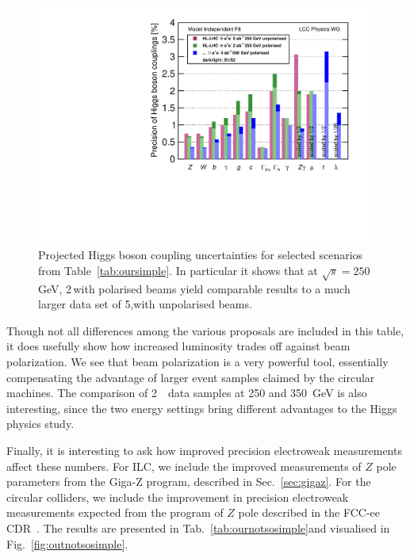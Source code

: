 \begin{figure}
\begin{center}
\includegraphics[width=0.7\hsize]{chapters/figures/DeltaHXX_SM_ILC_LEP_MI.pdf}
\caption{Projected Higgs boson coupling uncertainties for selected scenarios from Table~\ref{tab:oursimple}.
In particular it shows that at $\sqrt{s}=250$\,GeV, 2\,\iab  with polarised beams yield comparable results to a much larger data set of 5,\iab with unpolarised beams.}
\label{fig:oursimple}
\end{center}
\end{figure}


Though not all differences among the various proposals are included in
this table, it does usefully show how increased luminosity trades off
against beam polarization.   We see that beam polarization is a very
powerful tool, essentially compensating the advantage of larger event
samples claimed by the circular machines.   The comparison of 2~\iab\
data samples at 250 and 350~GeV is also interesting, since the two
energy settings bring different advantages to the Higgs physics study.


Finally, it is interesting to ask how improved precision electroweak
measurements affect these numbers. For ILC, we include the improved 
measurements of $Z$ pole parameters  from the Giga-Z program,
described
in Sec.~\ref{sec:gigaz}.  For the circular colliders, 
we include the improvement in
precision electroweak measurements expected from the program of $Z$
pole described in the FCC-ee CDR~\cite{Benedikt:2018qee}. The results are presented in 
Tab.~\ref{tab:ournotsosimple}and visualised in Fig.~\ref{fig:outnotsosimple}. 

